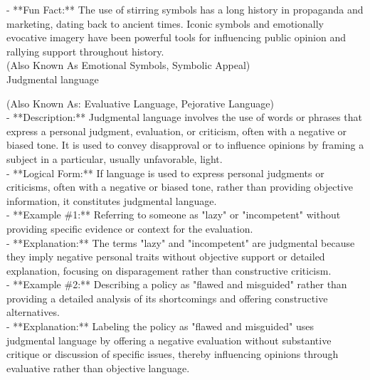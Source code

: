 \documentclass[a4paper,12pt,single,pdftex]{scrbook}
\begin{document}
    
      - **Fun Fact:** The use of stirring symbols has a long history in propaganda and marketing, dating back to ancient times. Iconic symbols and emotionally evocative imagery have been powerful tools for influencing public opinion and rallying support throughout history.
    \\

  
    
      (Also Known As Emotional Symbols, Symbolic Appeal)
    \\

  

Judgmental language
    
      (Also Known As: Evaluative Language, Pejorative Language)
    \\

  
    
      - **Description:** Judgmental language involves the use of words or phrases that express a personal judgment, evaluation, or criticism, often with a negative or biased tone. It is used to convey disapproval or to influence opinions by framing a subject in a particular, usually unfavorable, light.
    \\

    
      - **Logical Form:** If language is used to express personal judgments or criticisms, often with a negative or biased tone, rather than providing objective information, it constitutes judgmental language.
    \\

    
      - **Example \#1:** Referring to someone as "lazy" or "incompetent" without providing specific evidence or context for the evaluation.
    \\

    
      - **Explanation:** The terms "lazy" and "incompetent" are judgmental because they imply negative personal traits without objective support or detailed explanation, focusing on disparagement rather than constructive criticism.
    \\

    
      - **Example \#2:** Describing a policy as "flawed and misguided" rather than providing a detailed analysis of its shortcomings and offering constructive alternatives.
    \\

    
      - **Explanation:** Labeling the policy as "flawed and misguided" uses judgmental language by offering a negative evaluation without substantive critique or discussion of specific issues, thereby influencing opinions through evaluative rather than objective language.
    \\
\end{document}
